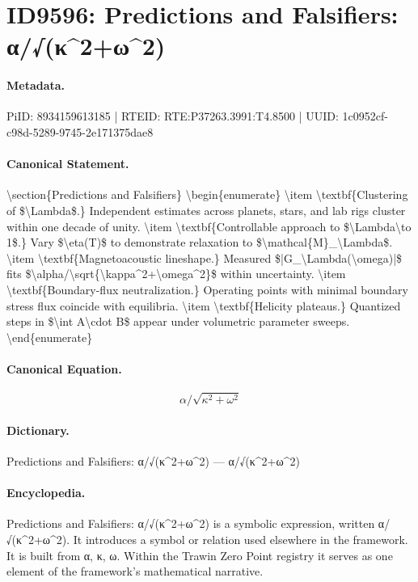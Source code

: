\section*{ID9596: Predictions and Falsifiers: α/√(κ\textasciicircum{}2+ω\textasciicircum{}2)}
\paragraph{Metadata.}
PiID: 8934159613185 | RTEID: RTE:P37263.3991:T4.8500 | UUID: 1c0952cf-c98d-5289-9745-2e171375dae8

\paragraph{Canonical Statement.}
\textbackslash{}section\{Predictions and Falsifiers\} \textbackslash{}begin\{enumerate\} \textbackslash{}item \textbackslash{}textbf\{Clustering of \$\textbackslash{}Lambda\$.\} Independent estimates across planets, stars, and lab rigs cluster within one decade of unity. \textbackslash{}item \textbackslash{}textbf\{Controllable approach to \$\textbackslash{}Lambda\textbackslash{}to 1\$.\} Vary \$\textbackslash{}eta(T)\$ to demonstrate relaxation to \$\textbackslash{}mathcal\{M\}\_\textbackslash{}Lambda\$. \textbackslash{}item \textbackslash{}textbf\{Magnetoacoustic lineshape.\} Measured \$|G\_\textbackslash{}Lambda(\textbackslash{}omega)|\$ fits \$\textbackslash{}alpha/\textbackslash{}sqrt\{\textbackslash{}kappa\textasciicircum{}2+\textbackslash{}omega\textasciicircum{}2\}\$ within uncertainty. \textbackslash{}item \textbackslash{}textbf\{Boundary-flux neutralization.\} Operating points with minimal boundary stress flux coincide with equilibria. \textbackslash{}item \textbackslash{}textbf\{Helicity plateaus.\} Quantized steps in \$\textbackslash{}int A\textbackslash{}cdot B\$ appear under volumetric parameter sweeps. \textbackslash{}end\{enumerate\}

\paragraph{Canonical Equation.}
\[
\alpha/\sqrt{\kappa^2+\omega^2}
\]

\paragraph{Dictionary.}
Predictions and Falsifiers: α/√(κ\textasciicircum{}2+ω\textasciicircum{}2) — α/√(κ\textasciicircum{}2+ω\textasciicircum{}2)

\paragraph{Encyclopedia.}
Predictions and Falsifiers: α/√(κ\textasciicircum{}2+ω\textasciicircum{}2) is a symbolic expression, written α/√(κ\textasciicircum{}2+ω\textasciicircum{}2). It introduces a symbol or relation used elsewhere in the framework. It is built from α, κ, ω. Within the Trawin Zero Point registry it serves as one element of the framework's mathematical narrative.
